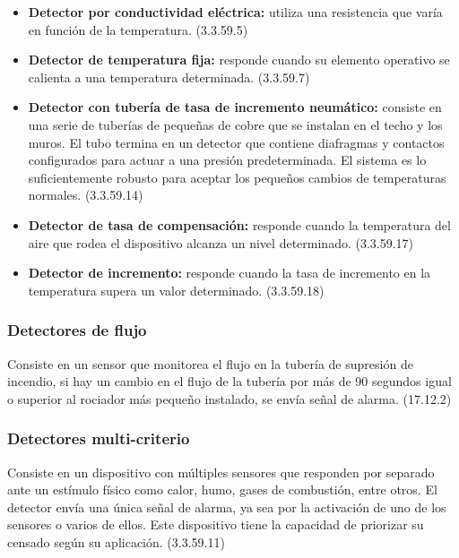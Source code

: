 \begin{itemize}
	
	\item \textbf{Detector por conductividad eléctrica:} utiliza una resistencia que varía en función de la temperatura. (3.3.59.5)
	
	\item \textbf{Detector de temperatura fija:} responde cuando su elemento operativo se calienta a una temperatura determinada. (3.3.59.7)
	
	\item \textbf{Detector con tubería de tasa de incremento neumático:} consiste en una serie de tuberías de pequeñas de cobre que se instalan en el techo y los muros. El tubo termina en un detector que contiene diafragmas y contactos configurados para actuar a una presión predeterminada. El sistema es lo suficientemente robusto para aceptar los pequeños cambios de temperaturas normales. (3.3.59.14)
	
	\item \textbf{Detector de tasa de compensación:} responde cuando la temperatura del aire que rodea el dispositivo alcanza un nivel determinado. (3.3.59.17)
	
	\item \textbf{Detector de incremento:} responde cuando la tasa de incremento en la temperatura supera un valor determinado. (3.3.59.18)
	
\end{itemize}
 
 
\subsubsection{Detectores de flujo} 
 
Consiste en un sensor que monitorea el flujo en la tubería de supresión de incendio, si hay un cambio en el flujo de la tubería por más de 90 segundos igual o superior al rociador más pequeño instalado, se envía señal de alarma. (17.12.2)
 

\subsubsection{Detectores multi-criterio}

Consiste en un dispositivo con múltiples sensores que responden por separado ante un estímulo físico como calor, humo, gases de combustión, entre otros. El detector envía una única señal de alarma, ya sea por la activación de uno de los sensores o varios de ellos. Este dispositivo tiene la capacidad de priorizar su censado según su aplicación. (3.3.59.11)   


